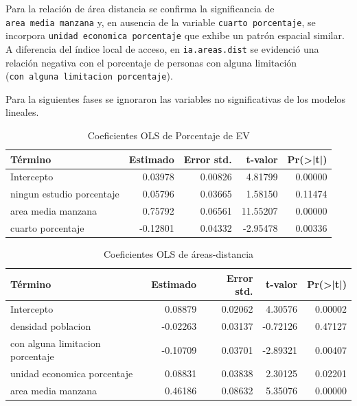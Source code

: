 \documentclass[12pt,a4paper,openany]{book}
\theoremstyle{definition}
\theoremstyle{definition}
\theoremstyle{definition}
\theoremstyle{remark}
\begin{document}
Para la relación de área distancia se confirma la significancia de
\texttt{area\ media\ manzana} y, en ausencia de la variable
\texttt{cuarto\ porcentaje}, se incorpora
\texttt{unidad\ economica\ porcentaje} que exhibe un patrón espacial
similar. A diferencia del índice local de acceso, en
\texttt{ia.areas.dist} se evidenció una relación negativa con el
porcentaje de personas con alguna limitación
(\texttt{con\ alguna\ limitacion\ porcentaje}).

Para la siguientes fases se ignoraron las variables no significativas de
los modelos lineales.

\begin{table}[t]

\caption{\label{tab:coef-lm-ptjeAEV}Coeficientes OLS de Porcentaje de EV}
\centering
\begin{tabular}{lrrrr}
\toprule
Término & Estimado & Error std. & t-valor & Pr(>|t|)\\
\midrule
Intercepto & 0.03978 & 0.00826 & 4.81799 & 0.00000\\
ningun estudio porcentaje & 0.05796 & 0.03665 & 1.58150 & 0.11474\\
area media manzana & 0.75792 & 0.06561 & 11.55207 & 0.00000\\
cuarto porcentaje & -0.12801 & 0.04332 & -2.95478 & 0.00336\\
\bottomrule
\end{tabular}
\end{table}

\begin{table}[t]

\caption{\label{tab:coef-lm-areadist}Coeficientes OLS de áreas-distancia}
\centering
\begin{tabular}{lrrrr}
\toprule
Término & Estimado & Error std. & t-valor & Pr(>|t|)\\
\midrule
Intercepto & 0.08879 & 0.02062 & 4.30576 & 0.00002\\
densidad poblacion & -0.02263 & 0.03137 & -0.72126 & 0.47127\\
con alguna limitacion porcentaje & -0.10709 & 0.03701 & -2.89321 & 0.00407\\
unidad economica porcentaje & 0.08831 & 0.03838 & 2.30125 & 0.02201\\
area media manzana & 0.46186 & 0.08632 & 5.35076 & 0.00000\\
\bottomrule
\end{tabular}
\end{table}
\end{document}
